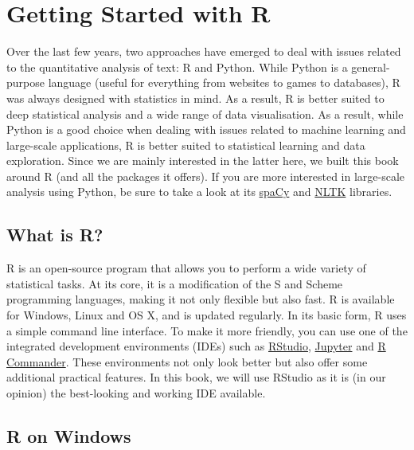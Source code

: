 \documentclass[
]{book}
\begin{document}
\chapter{Getting Started with R}\label{getting-started-with-r}

Over the last few years, two approaches have emerged to deal with issues related to the quantitative analysis of text: R and Python. While Python is a general-purpose language (useful for everything from websites to games to databases), R was always designed with statistics in mind. As a result, R is better suited to deep statistical analysis and a wide range of data visualisation. As a result, while Python is a good choice when dealing with issues related to machine learning and large-scale applications, R is better suited to statistical learning and data exploration. Since we are mainly interested in the latter here, we built this book around R (and all the packages it offers). If you are more interested in large-scale analysis using Python, be sure to take a look at its \href{https://spacy.io}{spaCy} and \href{https://www.nltk.org}{NLTK} libraries.

\section{What is R?}\label{what-is-r}

R is an open-source program that allows you to perform a wide variety of statistical tasks. At its core, it is a modification of the S and Scheme programming languages, making it not only flexible but also fast. R is available for Windows, Linux and OS X, and is updated regularly. In its basic form, R uses a simple command line interface. To make it more friendly, you can use one of the integrated development environments (IDEs) such as \href{https://www.rstudio.com/}{RStudio}, \href{https://jupyter.org/}{Jupyter} and \href{https://socialsciences.mcmaster.ca/jfox/Misc/Rcmdr/}{R Commander}. These environments not only look better but also offer some additional practical features. In this book, we will use RStudio as it is (in our opinion) the best-looking and working IDE available.

\section{R on Windows}\label{r-on-windows}
\end{document}
